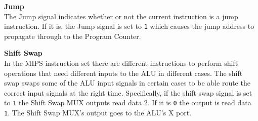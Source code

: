 \begin{description}
\item{\textbf{Jump}} \\
The Jump signal indicates whether or not the current instruction is a jump instruction.
If it is, the Jump signal is set to \texttt{1} which causes the jump address to propagate through to the Program Counter.

\item{\textbf{Shift Swap}} \\
In the MIPS instruction set there are different instructions to perform shift operations that need different inputs to the ALU in different cases.
The shift swap swaps some of the ALU input signals in certain cases to be able route the correct input signals at the right time.
Specifically, if the shift swap signal is set to \texttt{1} the Shift Swap MUX outputs read data 2.
If it is \texttt{0} the output is read data \texttt{1}.
The Shift Swap MUX's output goes to the ALU's X port.

\end{description}
